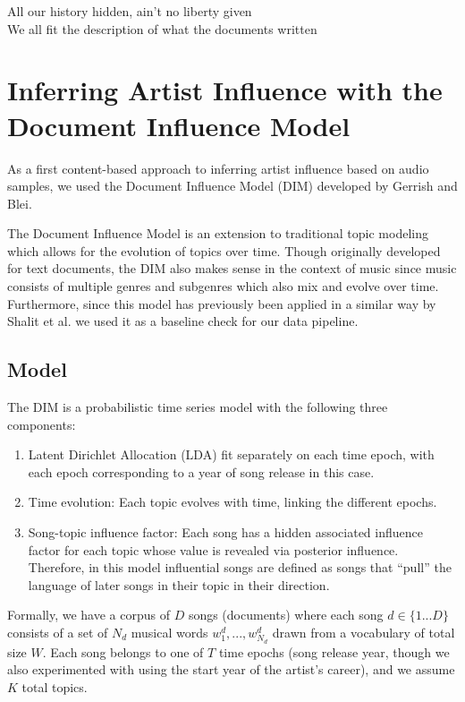 \begin{savequote}[75mm] 
All our history hidden, ain't no liberty given\\
We all fit the description of what the documents written
\end{savequote}

\chapter{Inferring Artist Influence with the Document Influence Model}
As a first content-based approach to inferring artist influence based on audio samples, we used the Document Influence Model (DIM) \cite{gerrish2010language} developed by Gerrish and Blei.

The Document Influence Model is an extension to traditional topic modeling which allows for the evolution of topics over time. Though originally developed for text documents, the DIM also makes sense in the context of music since music consists of multiple genres and subgenres which also mix and evolve over time. Furthermore, since this model has previously been applied in a similar way by Shalit et al. \cite{shalit2013modeling} we used it as a baseline check for our data pipeline.

\section{Model}
The DIM is a probabilistic time series model with the following three components:
\begin{enumerate}
    \item Latent Dirichlet Allocation (LDA) \cite{blei2003latent} fit separately on each time epoch, with each epoch corresponding to a year of song release in this case.
    \item Time evolution: Each topic evolves with time, linking the different epochs.
    \item Song-topic influence factor: Each song has a hidden associated influence factor for each topic whose value is revealed via posterior influence. Therefore, in this model influential songs are defined as songs that ``pull'' the language of later songs in their topic in their direction.
\end{enumerate}

Formally, we have a corpus of $D$ songs (documents) where each song $d \in \{1...D\}$ consists of a set of $N_d$ musical words $w_1^d,...,w_{N_d}^d$ drawn from a vocabulary of total size $W$. Each song belongs to one of $T$ time epochs (song release year, though we also experimented with using the start year of the artist's career), and we assume $K$ total topics.

